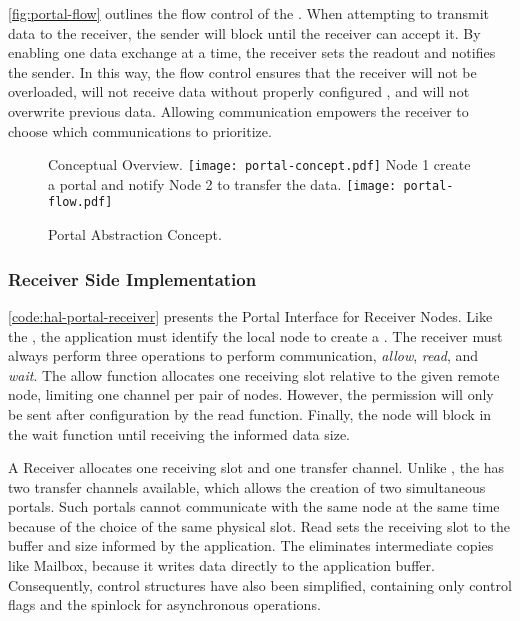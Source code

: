 			\autoref{fig:portal-flow} outlines the flow control of the \portal.
			When attempting to transmit data to the receiver, the sender will block
			until the receiver can accept it. By enabling one data exchange at a time,
			the receiver sets the readout and notifies the sender. In this way,
			the flow control ensures that the receiver will not be overloaded, will
			not receive data without properly configured \dma, and will not overwrite
			previous data. Allowing communication empowers the receiver to choose which
			communications to prioritize.

			\begin{figure}[!tb]
				\centering%
				\caption{Portal Abstraction Concept.}%
				\label{fig:portal}%

					{Conceptual Overview.}%
					{\texttt{[image: portal-concept.pdf]}}%
				\hspace{1cm}%
					{Node 1 create a portal and notify Node 2 to transfer the data.}%
					{\texttt{[image: portal-flow.pdf]}}%

			\end{figure}

			\subsubsection{Receiver Side Implementation}

				\autoref{code:hal-portal-receiver} presents the Portal Interface for
				Receiver Nodes. Like the \mailbox, the application must identify the
				local node to create a \portal. The receiver must always perform
				three operations to perform communication, \ie \textit{allow},
				\textit{read}, and \textit{wait}. The allow function allocates one
				receiving slot relative to the given remote node, limiting one
				channel per pair of nodes. However, the permission will only be
				sent after \dma configuration by the read function. Finally, the
				node will block in the wait function until receiving the informed
				data size.

				A Receiver allocates one \dnoc receiving slot and one \cnoc transfer
				channel. Unlike \mailbox, the \portal has two transfer channels
				available, which allows the creation of two simultaneous portals.
				Such portals cannot communicate with the same node at the same time
				because of the choice of the same physical slot. Read sets the
				receiving slot to the buffer and size informed by the application.
				The \dma eliminates intermediate copies like Mailbox, because it
				writes data directly to the application buffer. Consequently,
				control structures have also been simplified, containing only
				control flags and the spinlock for asynchronous operations.

